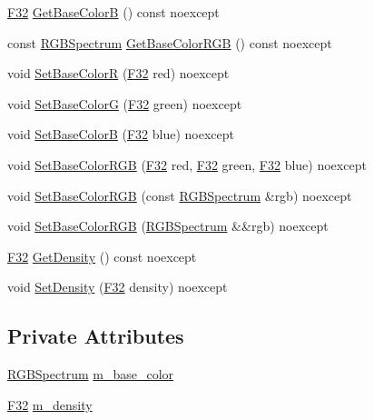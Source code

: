 \begin{DoxyCompactItemize}
\hyperlink{namespacemage_aa97e833b45f06d60a0a9c4fc22ae02c0}{F32} \hyperlink{classmage_1_1_scene_fog_ab223c70a71c13730425dee18061516bc}{Get\+Base\+ColorB} () const noexcept
\item 
const \hyperlink{structmage_1_1_r_g_b_spectrum}{R\+G\+B\+Spectrum} \hyperlink{classmage_1_1_scene_fog_a39742581a93d1b654bb257a3b41783ef}{Get\+Base\+Color\+R\+GB} () const noexcept
\item 
void \hyperlink{classmage_1_1_scene_fog_abc74a9cd83300bb00ea6779ff5c9e5af}{Set\+Base\+ColorR} (\hyperlink{namespacemage_aa97e833b45f06d60a0a9c4fc22ae02c0}{F32} red) noexcept
\item 
void \hyperlink{classmage_1_1_scene_fog_af13626f7fef6bfd6e4954f11fb0a7c0f}{Set\+Base\+ColorG} (\hyperlink{namespacemage_aa97e833b45f06d60a0a9c4fc22ae02c0}{F32} green) noexcept
\item 
void \hyperlink{classmage_1_1_scene_fog_a832992a0f8e771ae007b2a4c32d213b0}{Set\+Base\+ColorB} (\hyperlink{namespacemage_aa97e833b45f06d60a0a9c4fc22ae02c0}{F32} blue) noexcept
\item 
void \hyperlink{classmage_1_1_scene_fog_abda38bdb0b9b658efdca7b94c2930ab1}{Set\+Base\+Color\+R\+GB} (\hyperlink{namespacemage_aa97e833b45f06d60a0a9c4fc22ae02c0}{F32} red, \hyperlink{namespacemage_aa97e833b45f06d60a0a9c4fc22ae02c0}{F32} green, \hyperlink{namespacemage_aa97e833b45f06d60a0a9c4fc22ae02c0}{F32} blue) noexcept
\item 
void \hyperlink{classmage_1_1_scene_fog_a41be434d499b7c50a0b329165d29e7ac}{Set\+Base\+Color\+R\+GB} (const \hyperlink{structmage_1_1_r_g_b_spectrum}{R\+G\+B\+Spectrum} \&rgb) noexcept
\item 
void \hyperlink{classmage_1_1_scene_fog_a4e5e9ea50ed5bb1077fe69c2e6efc9e7}{Set\+Base\+Color\+R\+GB} (\hyperlink{structmage_1_1_r_g_b_spectrum}{R\+G\+B\+Spectrum} \&\&rgb) noexcept
\item 
\hyperlink{namespacemage_aa97e833b45f06d60a0a9c4fc22ae02c0}{F32} \hyperlink{classmage_1_1_scene_fog_adb3156f178ef56223329e73abb134e1c}{Get\+Density} () const noexcept
\item 
void \hyperlink{classmage_1_1_scene_fog_a35df66af255b6d274d7048e17b15bcb6}{Set\+Density} (\hyperlink{namespacemage_aa97e833b45f06d60a0a9c4fc22ae02c0}{F32} density) noexcept
\end{DoxyCompactItemize}
\subsection*{Private Attributes}
\begin{DoxyCompactItemize}
\item 
\hyperlink{structmage_1_1_r_g_b_spectrum}{R\+G\+B\+Spectrum} \hyperlink{classmage_1_1_scene_fog_a8cfaf40b3ee14359d4efdeba858d5cab}{m\+\_\+base\+\_\+color}
\item 
\hyperlink{namespacemage_aa97e833b45f06d60a0a9c4fc22ae02c0}{F32} \hyperlink{classmage_1_1_scene_fog_a16d4e67f373716f100ed6809c387b74c}{m\+\_\+density}
\end{DoxyCompactItemize}


